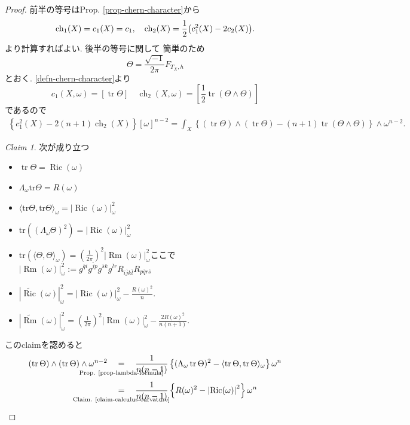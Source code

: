 \documentclass[dvipdfmx,a4paper,11pt]{article} %
\theoremstyle{definition}
\theoremstyle{remark}
\newtheorem{claim}[thm]{Claim}
\numberwithin{equation}{section}
\newcommand{\ch}{{\rm ch}}
\DeclareMathOperator{\Ric}{Ric}
\newcommand{\underalign}[2]{\quad \underset{\mathclap{\strut #1}}{#2}\quad}
\begin{document}
\begin{proof}
前半の等号はProp. \ref{prop-chern-character}から
$$
\ch_{1}(X)=c_{1}(X)=c_1,
\quad
\ch_{2}(X)=\frac12\bigl(c_{1}^{2}(X)-2c_{2}(X)\bigr).
$$
より計算すればよい. 後半の等号に関して
簡単のため
\[
\Theta=
\frac{\sqrt{-1}}{2\pi}F_{T_X,h}
\]
とおく. 
\ref{defn-chern-character}より
\[
c_1(X,\omega)=[\operatorname{tr}\Theta]
\quad 
\operatorname{ch}_2(X,\omega)
=
[\frac{1}{2}\operatorname{tr}(\Theta\wedge\Theta)]
\]
であるので
\begin{equation}
\label{eq-MY-chern}
\begin{aligned}
\left\{
c_1^2(X)-2(n+1)\operatorname{ch}_2(X)
\right\}[\omega]^{n-2}
=
\int_X
\left\{
(\operatorname{tr}\Theta)\wedge (\operatorname{tr}\Theta)
-
(n+1)\operatorname{tr}(\Theta\wedge\Theta)
\right\}
\wedge \omega^{n-2}.
\end{aligned}
\end{equation}

\begin{claim}
\label{claim-calculus-curvature}
次が成り立つ
\begin{itemize}
\item $\operatorname{tr}\Theta=\operatorname{Ric}(\omega)$ 
\item $\Lambda_{\omega} \mathrm{tr} \Theta = R(\omega)$
\item $\langle  \mathrm{tr} \Theta ,  \mathrm{tr} \Theta \rangle_{\omega}=|\Ric(\omega)|^{2}_{\omega}$
\item $\mathrm{tr}\left((\Lambda_{\omega}\Theta )^2 \right) =|\Ric(\omega)|^{2}_{\omega}$
\item $\mathrm{tr}\left(\langle  \Theta ,  \Theta \rangle_{\omega} \right) =
\left(\frac{1}{2\pi}\right)^2|\operatorname{Rm}(\omega)|^{2}_{\omega}$ここで$|\operatorname{Rm}(\omega)|^{2}_{\omega}:=g^{\overline{q}i}g^{\overline{j}p}g^{\overline{s}k}g^{\overline{l}r}R_{i\overline{j}k \overline{l}}R_{p\overline{q}r\overline{s}}$
\item $
\left|\widetilde{\operatorname{Ric}}(\omega)\right|_{\omega}^2=
\left|\operatorname{Ric}(\omega)\right|_{\omega}^2
-
\frac{R(\omega)^2}{n}.$
\item $
\left|\widetilde{\operatorname{Rm}}(\omega)\right|_{\omega}^2=
\left(\frac{1}{2\pi}\right)^2\left|\operatorname{Rm}(\omega)\right|_{\omega}^2
-
\frac{2R(\omega)^2}{n(n+1)}.
$
\end{itemize}
\end{claim}
このclaimを認めると
\begin{align*}
(\operatorname{tr}\Theta) \wedge (\operatorname{tr}\Theta)\wedge\omega^{n-2}
&\underalign{\text{Prop. \ref{prop-lambda-formula}}}{=}
\frac{1}{n(n-1)}
\left\{
(\Lambda_{\omega}\operatorname{tr}\Theta)^2
-\langle\operatorname{tr}\Theta, \operatorname{tr}\Theta \rangle_{\omega}
\right\}\omega^n
\\
&\underalign{\text{Claim. \ref{claim-calculus-curvature}}}{=}
\frac{1}{n(n-1)}
\left\{
R(\omega)^2
-
\left|\operatorname{Ric}(\omega)\right|^2
\right\}\omega^n
\end{align*}


\end{proof}
\end{document}
